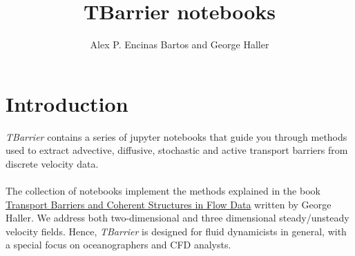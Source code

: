 \documentclass{article}
\begin{document}
\title{TBarrier notebooks}

\author{Alex P. Encinas Bartos and George Haller}

\maketitle

\tableofcontents

\section{Introduction}
\textit{TBarrier} contains a series of jupyter notebooks that guide you  through methods used to extract advective, diffusive, stochastic and active  transport barriers from discrete velocity data. \\ \\
The collection of notebooks implement the methods explained in the book \href{https://github.com/EncinasBartos/TBarrier}{Transport Barriers and Coherent Structures in Flow Data} written by George Haller. We address both two-dimensional and three dimensional steady/unsteady velocity fields. Hence, \textit{TBarrier} is designed for fluid dynamicists in general, with a special focus on oceanographers and CFD analysts.
\end{document}
